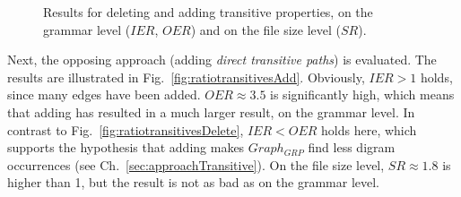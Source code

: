 \begin{figure}[h]
	\centering
	\hfill
	\caption{Results for deleting and adding transitive properties, on the grammar level ($IER$, $OER$) and on the file size level ($SR$).}
	\label{}
\end{figure}

Next, the opposing approach (adding \textit{direct transitive paths}) is evaluated. The results are illustrated in Fig.~\ref{fig:ratiotransitivesAdd}. Obviously, $ IER>1 $ holds, since many edges have been added. $OER\approx3.5$ is significantly high, which means that adding \dtps has resulted in a much larger result, on the grammar level. In contrast to Fig.~\ref{fig:ratiotransitivesDelete}, $IER<OER$ holds here, which supports the hypothesis that adding \dtps makes $Graph_{GRP}$ find less digram occurrences (see Ch.~\ref{sec:approachTransitive}). On the file size level, $SR\approx1.8$ is higher than 1, but the result is not as bad as on the grammar level. 

